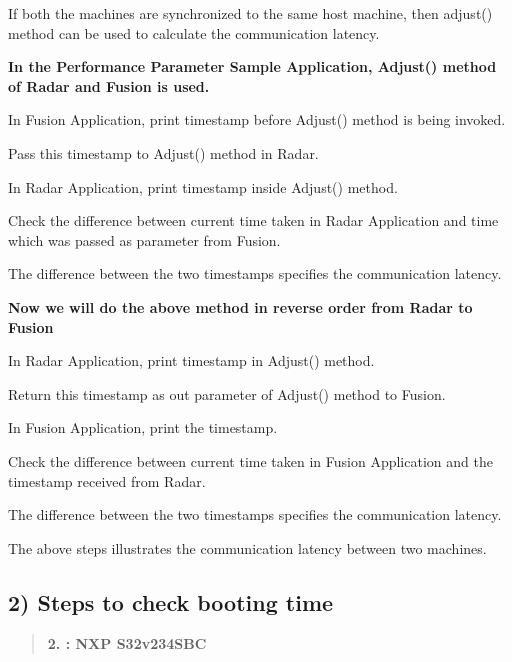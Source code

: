 \begin{DoxyEnumerate}
\item If both the machines are synchronized to the same host machine, then adjust() method can be used to calculate the communication latency.
\item {\bfseries  In the Performance Parameter Sample Application, Adjust() method of Radar and Fusion is used. }
\begin{DoxyItemize}
\item In Fusion Application, print timestamp before Adjust() method is being invoked. 
\item Pass this timestamp to Adjust() method in Radar. 
\item In Radar Application, print timestamp inside Adjust() method. 
\item Check the difference between current time taken in Radar Application and time which was passed as parameter from Fusion.
\item The difference between the two timestamps specifies the communication latency. 
\end{DoxyItemize}
\item {\bfseries  Now we will do the above method in reverse order from Radar to Fusion }
\begin{DoxyItemize}
\item In Radar Application, print timestamp in Adjust() method. 
\item Return this timestamp as out parameter of Adjust() method to Fusion. 
\item In Fusion Application, print the timestamp. 
\item Check the difference between current time taken in Fusion Application and the timestamp received from Radar.
\item The difference between the two timestamps specifies the communication latency. 
\end{DoxyItemize}
\item The above steps illustrates the communication latency between two machines.
\end{DoxyEnumerate}

\subsection*{2) Steps to check booting time}

\begin{quote}
{\bfseries 2. \+: N\+XP S32v234\+S\+BC} \end{quote}



